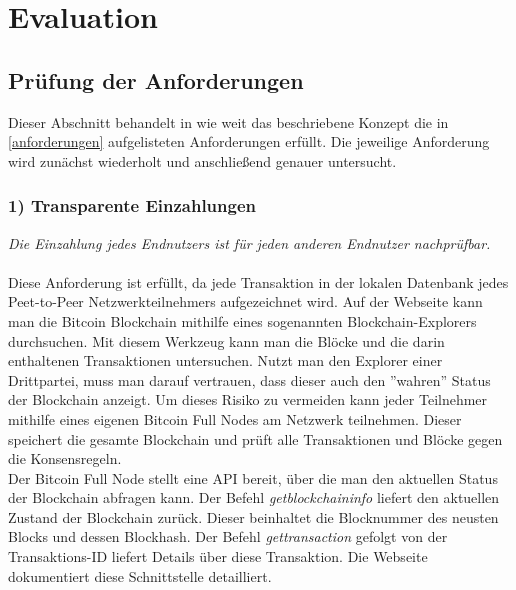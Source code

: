 \section{Evaluation}
\subsection{Prüfung der Anforderungen}\label{btc_evaluation}%

Dieser Abschnitt behandelt in wie weit das beschriebene Konzept die in \ref{anforderungen} aufgelisteten Anforderungen erfüllt. Die jeweilige Anforderung wird zunächst wiederholt und anschließend genauer untersucht.

\subsubsection{1) Transparente Einzahlungen}
\textit{Die Einzahlung jedes Endnutzers ist für jeden anderen Endnutzer nachprüfbar.}\\\\
Diese Anforderung ist erfüllt, da jede Transaktion in der lokalen Datenbank jedes Peet-to-Peer Netzwerkteilnehmers aufgezeichnet wird. 
Auf der Webseite \cite{blockchain_info} kann man die Bitcoin Blockchain mithilfe eines sogenannten Blockchain-Explorers durchsuchen. Mit diesem Werkzeug kann man die Blöcke und die darin enthaltenen Transaktionen untersuchen. Nutzt man den Explorer einer Drittpartei, muss man darauf vertrauen, dass dieser auch den ''wahren'' Status der Blockchain anzeigt. Um dieses Risiko zu vermeiden kann jeder Teilnehmer mithilfe eines eigenen Bitcoin Full Nodes am Netzwerk teilnehmen. Dieser speichert die gesamte Blockchain und prüft alle Transaktionen und Blöcke gegen die Konsensregeln.\\
Der Bitcoin Full Node stellt eine API bereit, über die man den aktuellen Status der Blockchain abfragen kann. Der Befehl \textit{getblockchaininfo} liefert den aktuellen Zustand der Blockchain zurück. Dieser beinhaltet die Blocknummer des neusten Blocks und dessen Blockhash. Der Befehl \textit{gettransaction} gefolgt von der Transaktions-ID liefert Details über diese Transaktion. Die Webseite \cite{btc_api} dokumentiert diese Schnittstelle detailliert. 

